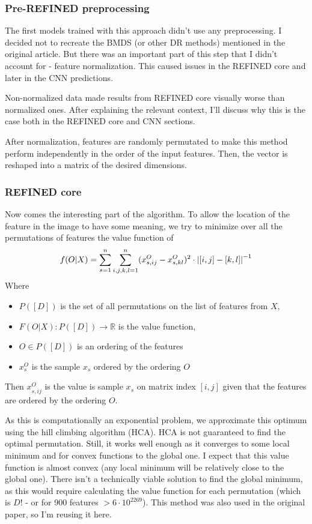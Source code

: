 \subsubsection{Pre-REFINED preprocessing}

The first models trained with this approach didn't use any preprocessing. I decided not to recreate the BMDS (or other DR methods) mentioned in the original article. But there was an important part of this step that I didn't account for - feature normalization. This caused issues in the REFINED core and later in the CNN predictions.

Non-normalized data made results from REFINED core visually worse than normalized ones. After explaining the relevant context, I'll discuss why this is the case both in the REFINED core and CNN sections.

After normalization, features are randomly permutated to make this method perform independently in the order of the input features. Then, the vector is reshaped into a matrix of the desired dimensions. 

\subsubsection{REFINED core}

Now comes the interesting part of the algorithm. To allow the location of the feature in the image to have some meaning, we try to minimize over all the permutations of features the value function of 
    $$ f(O|X) = \sum_{s=1}^{n} \sum_{i, j, k, l =1}^n (x^O_{s, ij} - x^O_{s, kl})^2 \cdot \left|{[i,j] - [k,l]}\right|^{-1}$$
Where
\begin{itemize}
    \item $P([D])$ is the set of all permutations on the list of features from $X$,
    \item $F(O|X): P([D]) \rightarrow \mathbb{R}$ is the value function,
    \item $O \in P([D])$ is an ordering of the features
    \item $x^O_s$ is the sample $x_s$ ordered by the ordering $O$
\end{itemize}
Then $x^O_{s, ij}$ is the value is sample $x_s$ on matrix index $[i,j]$ given that the features are ordered by the ordering $O$.

As this is computationally an exponential problem, we approximate this optimum using the hill climbing algorithm (HCA). HCA is not guaranteed to find the optimal permutation. Still, it works well enough as it converges to some local minimum and for convex functions to the global one. I expect that this value function is almost convex (any local minimum will be relatively close to the global one). There isn't a technically viable solution to find the global minimum, as this would require calculating the value function for each permutation (which is $D!$ - or for 900 features $>6\cdot 10^{2269}$). This method was also used in the original paper, so I'm reusing it here.

